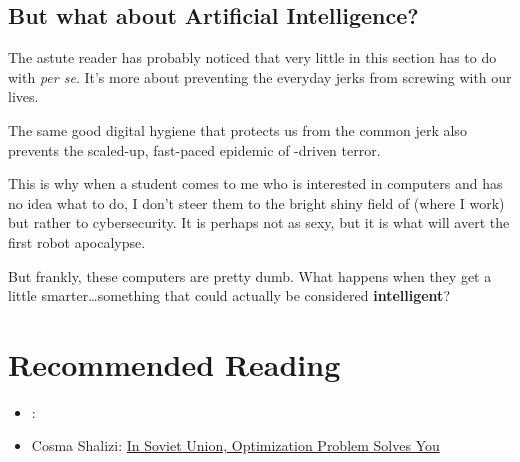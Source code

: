 \subsection{But what about Artificial Intelligence?}

The astute reader has probably noticed that very little in this
section has to do with  \textit{per se}.  It's more about preventing
the everyday jerks from screwing with our lives.

The same good digital hygiene that protects us from the common jerk
also prevents the scaled-up, fast-paced epidemic of -driven terror.  

This is why when a student comes to me who is interested in computers
and has no idea what to do, I don't steer them to the bright shiny
field of  (where I work) but rather to cybersecurity.  It is
perhaps not as sexy, but it is what will avert the first robot apocalypse.

But frankly, these computers are pretty dumb.  What happens when they
get a little smarter\dots something that could actually be considered
{\bf intelligent}?


\clearpage

\section{Recommended Reading}


\begin{itemize}

  \item \citet{spufford-10}: 

  \item Cosma Shalizi: \href{http://crookedtimber.org/2012/05/30/in-soviet-union-optimization-problem-solves-you/}{In Soviet Union, Optimization Problem Solves You}

\end{itemize}
